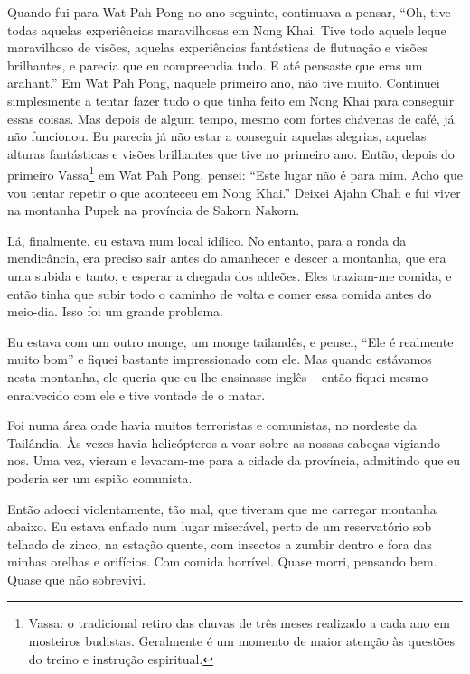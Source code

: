 Quando fui para Wat Pah Pong no ano seguinte, continuava a pensar, ``Oh, tive
todas aquelas experiências maravilhosas em Nong Khai. Tive todo aquele leque
maravilhoso de visões, aquelas experiências fantásticas de flutuação e visões
brilhantes, e parecia que eu compreendia tudo. E até pensaste que eras um
arahant.'' Em Wat Pah Pong, naquele primeiro ano, não tive muito. Continuei
simplesmente a tentar fazer tudo o que tinha feito em Nong Khai para conseguir
essas coisas. Mas depois de algum tempo, mesmo com fortes chávenas de café, já
não funcionou. Eu parecia já não estar a conseguir aquelas alegrias, aquelas
alturas fantásticas e visões brilhantes que tive no primeiro ano. Então, depois
do primeiro Vassa\footnote{Vassa: o tradicional retiro das chuvas de três meses
  realizado a cada ano em mosteiros budistas. Geralmente é um momento de maior
  atenção às questões do treino e instrução espiritual.} em Wat Pah Pong,
pensei: ``Este lugar não é para mim. Acho que vou tentar repetir o que aconteceu
em Nong Khai.'' Deixei Ajahn Chah e fui viver na montanha Pupek na província de
Sakorn Nakorn.

Lá, finalmente, eu estava num local idílico. No entanto, para a ronda da
mendicância, era preciso sair antes do amanhecer e descer a montanha, que era
uma subida e tanto, e esperar a chegada dos aldeões. Eles traziam-me comida, e
então tinha que subir todo o caminho de volta e comer essa comida antes do
meio-dia. Isso foi um grande problema.

Eu estava com um outro monge, um monge tailandês, e pensei, ``Ele é realmente
muito bom'' e fiquei bastante impressionado com ele. Mas quando estávamos nesta
montanha, ele queria que eu lhe ensinasse inglês -- então fiquei mesmo
enraivecido com ele e tive vontade de o matar.

Foi numa área onde havia muitos terroristas e comunistas, no nordeste da
Tailândia. Às vezes havia helicópteros a voar sobre as nossas cabeças
vigiando-nos. Uma vez, vieram e levaram-me para a cidade da província, admitindo
que eu poderia ser um espião comunista.

Então adoeci violentamente, tão mal, que tiveram que me carregar montanha
abaixo. Eu estava enfiado num lugar miserável, perto de um reservatório sob
telhado de zinco, na estação quente, com insectos a zumbir dentro e fora das
minhas orelhas e orifícios. Com comida horrível. Quase morri, pensando bem.
Quase que não sobrevivi.

